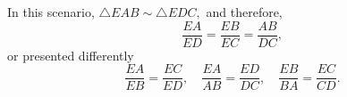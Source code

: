 \documentclass[11pt, oneside]{article}   	%
\begin{document}
In this scenario, $\triangle EAB \sim \triangle EDC,$ and therefore, $$\frac{EA}{ED} = \frac{EB}{EC} = \frac{AB}{DC}, $$ or presented differently $$\frac{EA}{EB} = \frac{EC}{ED}, \quad\frac{EA}{AB} = \frac{ED}{DC}, \quad\frac{EB}{BA} = \frac{EC}{CD}.$$

















\end{document}
